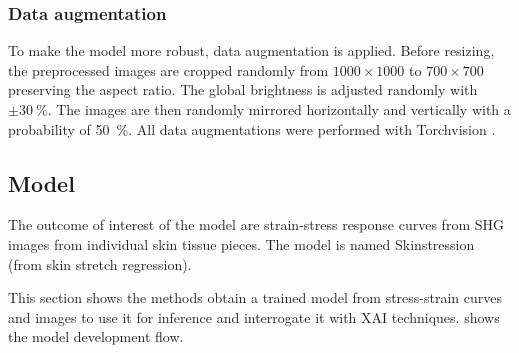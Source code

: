 
\subsubsection{Data augmentation}

To make the model more robust, data augmentation is applied.
Before resizing, the preprocessed images are cropped randomly from $1000\times1000$ to $700\times700$ preserving the aspect ratio.
The global brightness is adjusted randomly with $\pm \qty{30}{\percent}$.
The images are then randomly mirrored horizontally and vertically with a probability of \qty{50}{\percent}.
All data augmentations were performed with Torchvision .


\subsection{Model}
The outcome of interest of the model are strain-stress response curves from SHG images from individual skin tissue pieces.
The model is named Skinstression (from skin stretch regression).

This section shows the methods obtain a trained model from stress-strain curves and images to use it for inference and interrogate it with XAI techniques.
 shows the model development flow.

